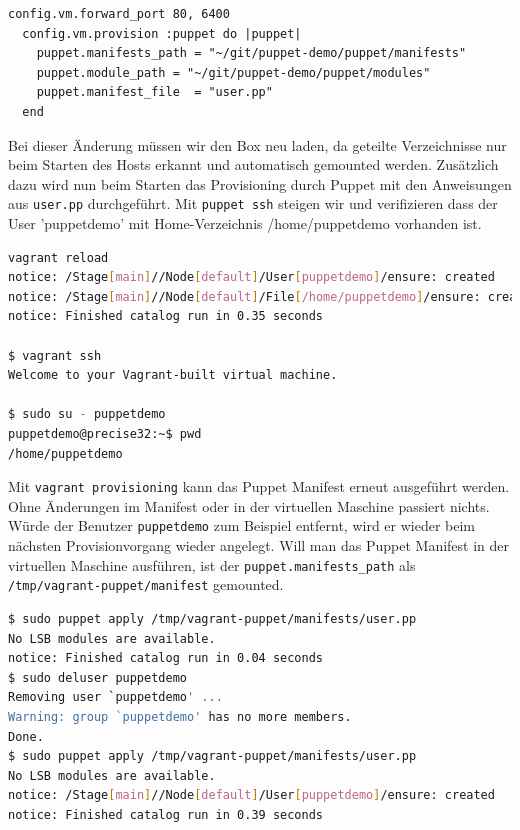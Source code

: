 \documentclass[12pt,a4paper,ngerman]{article}
\begin{document}
\begin{lstlisting}[language=vagrant,caption=Puppet Provisioning in Vagrantfile konfigurieren, label=vagrantprovisioning]
  config.vm.forward_port 80, 6400  
  config.vm.provision :puppet do |puppet|
    puppet.manifests_path = "~/git/puppet-demo/puppet/manifests"
    puppet.module_path = "~/git/puppet-demo/puppet/modules"
    puppet.manifest_file  = "user.pp"
  end
\end{lstlisting} 

Bei dieser Änderung müssen wir den Box neu laden, da geteilte Verzeichnisse nur beim Starten des Hosts erkannt und automatisch gemounted werden. Zusätzlich dazu wird nun beim Starten das Provisioning durch Puppet mit den Anweisungen aus \lstinline$user.pp$ durchgeführt. Mit \lstinline$puppet ssh$ steigen wir und verifizieren dass der User 'puppetdemo' mit Home-Verzeichnis /home/puppetdemo vorhanden ist.

\begin{lstlisting}[language=sh,caption=Vagrant Box neu laden, label=vagrant-reload]
vagrant reload
notice: /Stage[main]//Node[default]/User[puppetdemo]/ensure: created
notice: /Stage[main]//Node[default]/File[/home/puppetdemo]/ensure: created
notice: Finished catalog run in 0.35 seconds

$ vagrant ssh
Welcome to your Vagrant-built virtual machine.

$ sudo su - puppetdemo
puppetdemo@precise32:~$ pwd
/home/puppetdemo
\end{lstlisting}

Mit \lstinline$vagrant provisioning$ kann das Puppet Manifest erneut ausgeführt werden. Ohne Änderungen im Manifest oder in der virtuellen Maschine passiert nichts. Würde der Benutzer \lstinline$puppetdemo$ zum Beispiel entfernt, wird er wieder beim nächsten Provisionvorgang wieder angelegt.
Will man das Puppet Manifest in der virtuellen Maschine ausführen, ist der \lstinline$puppet.manifests_path$ als \lstinline$/tmp/vagrant-puppet/manifest$ gemounted.

\begin{lstlisting}[language=sh,caption=Puppet apply im Box, label=vagrant-apply]
$ sudo puppet apply /tmp/vagrant-puppet/manifests/user.pp
No LSB modules are available.
notice: Finished catalog run in 0.04 seconds
$ sudo deluser puppetdemo
Removing user `puppetdemo' ...
Warning: group `puppetdemo' has no more members.
Done.
$ sudo puppet apply /tmp/vagrant-puppet/manifests/user.pp
No LSB modules are available.
notice: /Stage[main]//Node[default]/User[puppetdemo]/ensure: created
notice: Finished catalog run in 0.39 seconds
\end{lstlisting}
\end{document}
